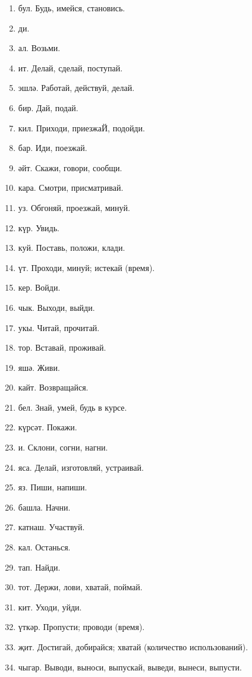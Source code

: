 \begin{multicols}{4}
\begin{enumerate}
    \item бул. Будь, имейся, становись.
    \item ди.
    \item ал. Возьми.
    \item ит. Делай, сделай, поступай.
    \item эшлә. Работай, действуй, делай.
    \item бир. Дай, подай.
    \item кил. Приходи, приезжаЙ, подойди.
    \item бар. Иди, поезжай.
    \item әйт. Скажи, говори, сообщи.
    \item кара. Смотри, присматривай.
    \item уз. Обгоняй, проезжай, минуй.
    \item күр. Увидь.
    \item куй. Поставь, положи, клади.
    \item үт. Проходи, минуй; истекай (время).
    \item кер. Войди.
    \item чык. Выходи, выйди.
    \item укы. Читай, прочитай.
    \item тор. Вставай, проживай.
    \item яшә. Живи.
    \item кайт. Возвращайся.
    \item бел. Знай, умей, будь в курсе.
    \item күрсәт. Покажи.
    \item и. Склони, согни, нагни.
    \item яса. Делай, изготовляй, устраивай.
    \item яз. Пиши, напиши.
    \item башла. Начни.
    \item катнаш. Участвуй.
    \item кал. Останься.
    \item тап. Найди.
    \item тот. Держи, лови, хватай, поймай.
    \item кит. Уходи, уйди.
    \item үткәр. Пропусти; проводи (время).
    \item җит. Достигай, добирайся; хватай (количество использований).
    \item чыгар. Выводи, выноси, выпускай, выведи, вынеси, выпусти.

\end{enumerate}
\end{multicols}
